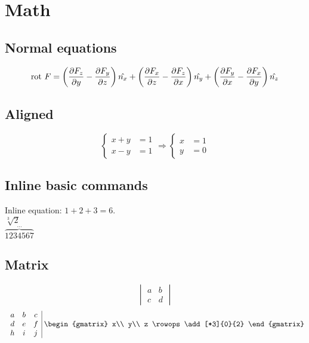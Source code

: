 \documentclass{article}[12pt]
\begin{document}
\section{Math}
	\subsection{Normal equations}
		\begin{equation}
			{\rm rot}\ F=\left(\frac{\partial F_z}{\partial y}-\frac{\partial F_y}{\partial z}\right)\hat{n_x}+\left(\frac{\partial F_x}{\partial z}-\frac{\partial F_z}{\partial x}\right)\hat{n_y}+\left(\frac{\partial F_y}{\partial x}-\frac{\partial F_x}{\partial y}\right)\hat{n_z}
		\end{equation}
		
	\subsection{Aligned}
		\begin{equation*}
			\left\lbrace
			\begin{aligned}
				x+y&=1\\
				x-y&=1
			\end{aligned}
			\right.
			\Longrightarrow
			\left\lbrace
			\begin{aligned}
				x&=1\\
				y&=0
			\end{aligned}
			\right.
		\end{equation*}

	\subsection{Inline basic commands}
		\noindent
		Inline equation: $1+2+3=6$.\\
		$\sqrt[3]{2}$ \\
		$\overbrace{1234567}^{\dots}$
		
	\subsection{Matrix}
	\begin{equation*}
		\begin{vmatrix}
			a & b\\
			c & d
		\end{vmatrix}
	\end{equation*}
	\begin{equation*}
		\left.
		\begin{array}{ccc|}
			a & b & c\\
			d & e & f\\
			h & i & j
		\end{array}
		\right.
		\begin{gmatrix}
			x\\
			y\\
			z
			\rowops
			\add[*3]{0}{2}
		\end{gmatrix}
	\end{equation*}
	
\end{document}
